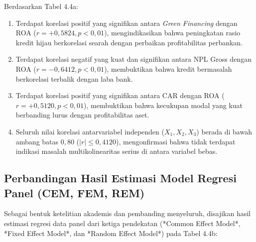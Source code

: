 \documentclass[12pt,a4paper]{article}
\numberwithin{equation}{section}
\begin{document}
\noindent
Berdasarkan Tabel 4.4a:
\begin{enumerate}
  \item Terdapat korelasi positif yang signifikan antara \emph{Green Financing} dengan ROA ($r = +0{,}5824, p < 0{,}01$), mengindikasikan bahwa peningkatan rasio kredit hijau berkorelasi searah dengan perbaikan profitabilitas perbankan.
  \item Terdapat korelasi negatif yang kuat dan signifikan antara NPL Gross dengan ROA ($r = -0{,}6412, p < 0{,}01$), membuktikan bahwa kredit bermasalah berkorelasi terbalik dengan laba bank.
  \item Terdapat korelasi positif yang signifikan antara CAR dengan ROA ($r = +0{,}5120, p < 0{,}01$), membuktikan bahwa kecukupan modal yang kuat berbanding lurus dengan profitabilitas aset.
  \item Seluruh nilai korelasi antarvariabel independen ($X_1, X_2, X_3$) berada di bawah ambang batas $0{,}80$ ($|r| \le 0{,}4120$), mengonfirmasi bahwa tidak terdapat indikasi masalah multikolinearitas serius di antara variabel bebas.
\end{enumerate}

\clearpage
\subsection{Perbandingan Hasil Estimasi Model Regresi Panel (CEM, FEM, REM)}

\noindent
Sebagai bentuk ketelitian akademis dan pembanding menyeluruh, disajikan hasil estimasi regresi data panel dari ketiga pendekatan (*Common Effect Model*, *Fixed Effect Model*, dan *Random Effect Model*) pada Tabel 4.4b:
\end{document}
